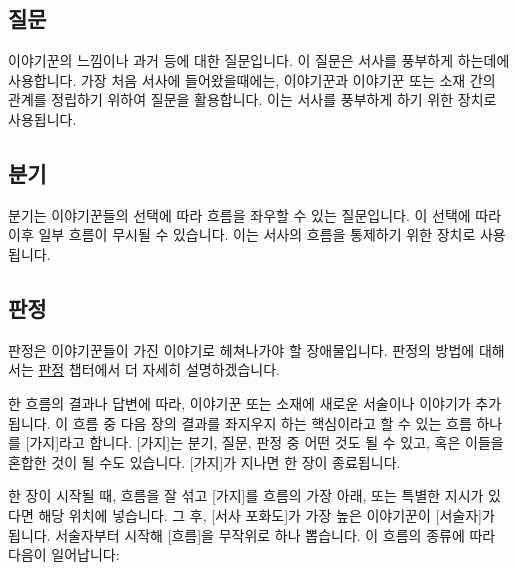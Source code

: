 \documentclass{report}
\begin{document}
		\subsection*{질문}
			이야기꾼의 느낌이나 과거 등에 대한 질문입니다. 이 질문은 서사를 풍부하게 하는데에 사용합니다. 가장 처음 서사에 들어왔을때에는, 이야기꾼과 이야기꾼 또는 소재 간의 관계를 정립하기 위하여 질문을 활용합니다. 이는 서사를 풍부하게 하기 위한 장치로 사용됩니다.
		
		\subsection*{분기}
			분기는 이야기꾼들의 선택에 따라 흐름을 좌우할 수 있는 질문입니다. 이 선택에 따라 이후 일부 흐름이 무시될 수 있습니다. 이는 서사의 흐름을 통제하기 위한 장치로 사용됩니다.
		
		\subsection*{판정}
			판정은 이야기꾼들이 가진 이야기로 헤쳐나가야 할 장애물입니다. 판정의 방법에 대해서는 \hyperlink{nogm-diceroll}{판정} 챕터에서 더 자세히 설명하겠습니다.
		
		\bigskip
		
		한 흐름의 결과나 답변에 따라, 이야기꾼 또는 소재에 새로운 서술이나 이야기가 추가됩니다. 이 흐름 중 다음 장의 결과를 좌지우지 하는 핵심이라고 할 수 있는 흐름 하나를 [가지]라고 합니다. [가지]는 분기, 질문, 판정 중 어떤 것도 될 수 있고, 혹은 이들을 혼합한 것이 될 수도 있습니다. [가지]가 지나면 한 장이 종료됩니다.
		
		한 장이 시작될 때, 흐름을 잘 섞고 [가지]를 흐름의 가장 아래, 또는 특별한 지시가 있다면 해당 위치에 넣습니다. 그 후, [서사 포화도]가 가장 높은 이야기꾼이 [서술자]가 됩니다. 서술자부터 시작해 [흐름]을 무작위로 하나 뽑습니다. 이 흐름의 종류에 따라 다음이 일어납니다:
		
		\smallskip
		
\end{document}
